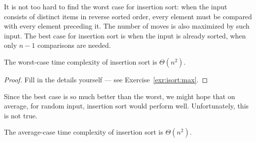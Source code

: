 It is not too hard to find the worst case for insertion sort: when the input 
consists of distinct items in reverse sorted order, every element must be 
compared with every element preceding it. The number of moves is also 
maximized by such input. The best case for insertion sort is when the input is 
already sorted, when only $n-1$ comparisons are needed.


\begin{Lemma} \label{lem:worst insort}
The worst-case time complexity of insertion sort is $\Theta(n^2)$.
\end{Lemma}
\begin{proof}
Fill in the details yourself --- see Exercise~\ref{exr:isort:max}.
\end{proof}

Since the best case is so much better than the worst, we might hope that on 
average, for random input, insertion sort would perform well. Unfortunately, 
this is not true.

\begin{Lemma}\label{lem:ave:insort}
The average-case time complexity of insertion sort is \(\Theta(n^2 )\).
\end{Lemma}

